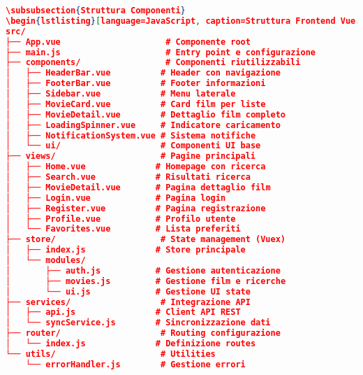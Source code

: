 \documentclass[11pt,a4paper]{article}
\begin{document}
\begin{lstlisting}[language=JSON, caption=Schema Tabelle Utente]
\subsubsection{Struttura Componenti}
\begin{lstlisting}[language=JavaScript, caption=Struttura Frontend Vue.js]
src/
├── App.vue                     # Componente root
├── main.js                     # Entry point e configurazione
├── components/                 # Componenti riutilizzabili
│   ├── HeaderBar.vue          # Header con navigazione
│   ├── FooterBar.vue          # Footer informazioni
│   ├── Sidebar.vue            # Menu laterale
│   ├── MovieCard.vue          # Card film per liste
│   ├── MovieDetail.vue        # Dettaglio film completo
│   ├── LoadingSpinner.vue     # Indicatore caricamento
│   ├── NotificationSystem.vue # Sistema notifiche
│   └── ui/                    # Componenti UI base
├── views/                     # Pagine principali
│   ├── Home.vue              # Homepage con ricerca
│   ├── Search.vue            # Risultati ricerca
│   ├── MovieDetail.vue       # Pagina dettaglio film
│   ├── Login.vue             # Pagina login
│   ├── Register.vue          # Pagina registrazione
│   ├── Profile.vue           # Profilo utente
│   └── Favorites.vue         # Lista preferiti
├── store/                     # State management (Vuex)
│   ├── index.js              # Store principale
│   └── modules/
│       ├── auth.js           # Gestione autenticazione
│       ├── movies.js         # Gestione film e ricerche
│       └── ui.js             # Gestione UI state
├── services/                  # Integrazione API
│   ├── api.js                # Client API REST
│   └── syncService.js        # Sincronizzazione dati
├── router/                    # Routing configurazione
│   └── index.js              # Definizione routes
└── utils/                     # Utilities
    └── errorHandler.js        # Gestione errori
\end{lstlisting}
\end{document}
